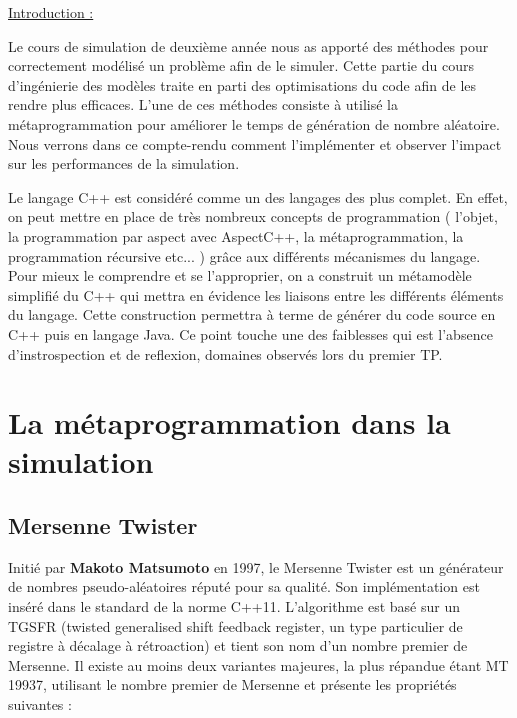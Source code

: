 \documentclass[a4paper,11pt]{report}
\begin{document}

\tableofcontents
\newpage

\listoffigures
\newpage


\begin{flushleft}
\LARGE{ \underline {Introduction :}\bigskip}
\end{flushleft}

\normalsize{
Le cours de simulation de deuxième année nous as apporté des méthodes pour correctement modélisé un problème afin de le simuler. Cette partie du cours d'ingénierie des modèles traite en parti des optimisations du code afin de les rendre plus efficaces. L'une de ces méthodes consiste à utilisé la métaprogrammation pour améliorer le temps de génération de nombre aléatoire. Nous verrons dans ce compte-rendu comment l'implémenter et observer l'impact sur les performances de la simulation. \\
}

\normalsize{
Le langage C++ est considéré comme un des langages des plus complet. En effet, on peut mettre en place de très nombreux concepts de programmation ( l'objet, la programmation par aspect avec AspectC++, la métaprogrammation, la programmation récursive etc... ) grâce aux différents mécanismes du langage. Pour mieux le comprendre et se l'approprier, on a construit un métamodèle simplifié du C++ qui mettra en évidence les liaisons entre les différents éléments du langage. Cette construction permettra à terme de générer du code source en C++ puis en langage Java. Ce point touche une des faiblesses qui est l'absence d'instrospection et de reflexion, domaines observés lors du premier TP.
}


\chapter {La métaprogrammation dans la simulation}

\section{ Mersenne Twister}

\normalsize{
Initié par {\bf Makoto Matsumoto} en 1997, le Mersenne Twister est un générateur de nombres pseudo-aléatoires réputé pour sa qualité. Son implémentation est inséré dans le standard de la norme C++11. L'algorithme est basé sur un TGSFR (twisted generalised shift feedback register, un type particulier de registre à décalage à rétroaction) et tient son nom d'un nombre premier de Mersenne. Il existe au moins deux variantes majeures, la plus répandue étant MT 19937, utilisant le nombre premier de Mersenne  et présente les propriétés suivantes : \\
}
\end{document}
